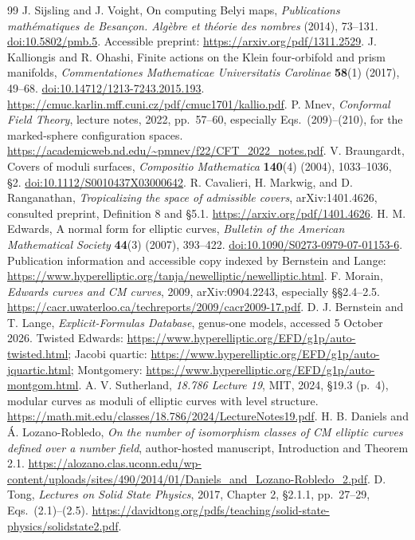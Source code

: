 \begin{thebibliography}{99}
 J. Sijsling and J. Voight, On computing Belyi maps, \emph{Publications mathématiques de Besançon. Algèbre et théorie des nombres} (2014), 73--131. \href{https://doi.org/10.5802/pmb.5}{doi:10.5802/pmb.5}. Accessible preprint: \url{https://arxiv.org/pdf/1311.2529}.
 J. Kalliongis and R. Ohashi, Finite actions on the Klein four-orbifold and prism manifolds, \emph{Commentationes Mathematicae Universitatis Carolinae} \textbf{58}(1) (2017), 49--68. \href{https://doi.org/10.14712/1213-7243.2015.193}{doi:10.14712/1213-7243.2015.193}. \url{https://cmuc.karlin.mff.cuni.cz/pdf/cmuc1701/kallio.pdf}.
 P. Mnev, \emph{Conformal Field Theory}, lecture notes, 2022, pp.~57--60, especially Eqs.~(209)--(210), for the marked-sphere configuration spaces. \url{https://academicweb.nd.edu/~pmnev/f22/CFT_2022_notes.pdf}.
 V. Braungardt, Covers of moduli surfaces, \emph{Compositio Mathematica} \textbf{140}(4) (2004), 1033--1036, \S2. \href{https://doi.org/10.1112/S0010437X03000642}{doi:10.1112/S0010437X03000642}.
 R. Cavalieri, H. Markwig, and D. Ranganathan, \emph{Tropicalizing the space of admissible covers}, arXiv:1401.4626, consulted preprint, Definition 8 and \S5.1. \url{https://arxiv.org/pdf/1401.4626}.
 H. M. Edwards, A normal form for elliptic curves, \emph{Bulletin of the American Mathematical Society} \textbf{44}(3) (2007), 393--422. \href{https://doi.org/10.1090/S0273-0979-07-01153-6}{doi:10.1090/S0273-0979-07-01153-6}. Publication information and accessible copy indexed by Bernstein and Lange: \url{https://www.hyperelliptic.org/tanja/newelliptic/newelliptic.html}.
 F. Morain, \emph{Edwards curves and CM curves}, 2009, arXiv:0904.2243, especially \S\S2.4--2.5. \url{https://cacr.uwaterloo.ca/techreports/2009/cacr2009-17.pdf}.
 D. J. Bernstein and T. Lange, \emph{Explicit-Formulas Database}, genus-one models, accessed 5 October 2026. Twisted Edwards: \url{https://www.hyperelliptic.org/EFD/g1p/auto-twisted.html}; Jacobi quartic: \url{https://www.hyperelliptic.org/EFD/g1p/auto-jquartic.html}; Montgomery: \url{https://www.hyperelliptic.org/EFD/g1p/auto-montgom.html}.
 A. V. Sutherland, \emph{18.786 Lecture 19}, MIT, 2024, \S19.3 (p.~4), modular curves as moduli of elliptic curves with level structure. \url{https://math.mit.edu/classes/18.786/2024/LectureNotes19.pdf}.
 H. B. Daniels and Á. Lozano-Robledo, \emph{On the number of isomorphism classes of CM elliptic curves defined over a number field}, author-hosted manuscript, Introduction and Theorem 2.1. \url{https://alozano.clas.uconn.edu/wp-content/uploads/sites/490/2014/01/Daniels_and_Lozano-Robledo_2.pdf}.
 D. Tong, \emph{Lectures on Solid State Physics}, 2017, Chapter 2, \S2.1.1, pp.~27--29, Eqs.~(2.1)--(2.5). \url{https://davidtong.org/pdfs/teaching/solid-state-physics/solidstate2.pdf}.
\end{thebibliography}
